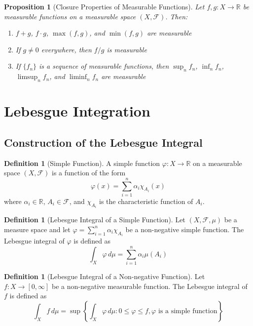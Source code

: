 \documentclass[12pt,a4paper]{article}
\theoremstyle{plain}
\newtheorem{proposition}[theorem]{Proposition}
\theoremstyle{definition}
\newtheorem{definition}[theorem]{Definition}
\begin{document}
\begin{proposition}[Closure Properties of Measurable Functions]
Let $f, g: X \to \mathbb{R}$ be measurable functions on a measurable space $(X, \mathcal{F})$. Then:
\begin{enumerate}[label=(\roman*)]
\item $f + g$, $f \cdot g$, $\max(f, g)$, and $\min(f, g)$ are measurable
\item If $g \neq 0$ everywhere, then $f/g$ is measurable
\item If $\{f_n\}$ is a sequence of measurable functions, then $\sup_n f_n$, $\inf_n f_n$, $\limsup_n f_n$, and $\liminf_n f_n$ are measurable
\end{enumerate}
\end{proposition}

\section{Lebesgue Integration}

\subsection{Construction of the Lebesgue Integral}

\begin{definition}[Simple Function]
A simple function $\varphi: X \to \mathbb{R}$ on a measurable space $(X, \mathcal{F})$ is a function of the form
\begin{equation}
\varphi(x) = \sum_{i=1}^{n} \alpha_i \chi_{A_i}(x)
\end{equation}
where $\alpha_i \in \mathbb{R}$, $A_i \in \mathcal{F}$, and $\chi_{A_i}$ is the characteristic function of $A_i$.
\end{definition}

\begin{definition}[Lebesgue Integral of a Simple Function]
Let $(X, \mathcal{F}, \mu)$ be a measure space and let $\varphi = \sum_{i=1}^{n} \alpha_i \chi_{A_i}$ be a non-negative simple function. The Lebesgue integral of $\varphi$ is defined as
\begin{equation}
\int_X \varphi \, d\mu = \sum_{i=1}^{n} \alpha_i \mu(A_i)
\end{equation}
\end{definition}

\begin{definition}[Lebesgue Integral of a Non-negative Function]
Let $f: X \to [0, \infty]$ be a non-negative measurable function. The Lebesgue integral of $f$ is defined as
\begin{equation}
\int_X f \, d\mu = \sup \left\{ \int_X \varphi \, d\mu : 0 \leq \varphi \leq f, \varphi \text{ is a simple function} \right\}
\end{equation}
\end{definition}
\end{document}
